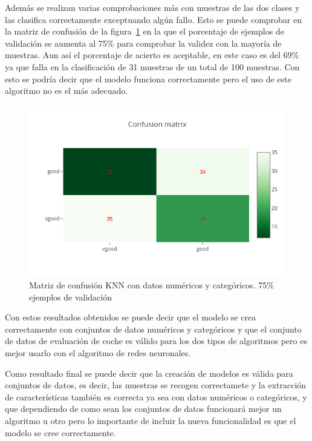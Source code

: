 \documentclass[a4paper, 12pt]{book}
\begin{document}
Además se realizan varias comprobaciones más con muestras de las dos clases y las clasifica correctamente exceptuando algún fallo. Esto se puede comprobar en la matriz de confusión de la figura~\ref{fig:ejemplo26} en la que el porcentaje de ejemplos de validación se aumenta al 75\% para comprobar la validez con la mayoría de muestras. 
Aun así el porcentaje de acierto es aceptable, en este caso es del 69\% ya que falla en la clasificación de 31 muestras de un total de 100 muestras. Con esto se podría decir que el modelo funciona correctamente pero el uso de este algoritmo no es el más adecuado.

\begin{figure}
	\centering
	\includegraphics[width=12cm, keepaspectratio]{img/cm_numycat_knn2.png}
	\caption{Matriz de confusión KNN con datos numéricos y categóricos. 75\% ejemplos de validación} 	
	\label{fig:ejemplo26}
\end{figure}

Con estos resultados obtenidos se puede decir que el modelo se crea correctamente con conjuntos de datos numéricos y categóricos y que el conjunto de datos de evaluación de coche es válido para los dos tipos de algoritmos pero es mejor usarlo con el algoritmo de redes neuronales.

Como resultado final se puede decir que la creación de modelos es válida para conjuntos de datos, es decir, las muestras se recogen correctamete y la extracción de características también es correcta ya sea con datos numéricos o categóricos, y que dependiendo de como sean los conjuntos de datos funcionará mejor un algoritmo u otro pero lo importante de incluir la nueva funcionalidad es que el modelo se cree correctamente.




\end{document}
